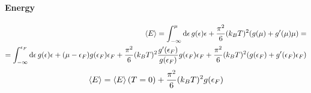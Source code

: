 \paragraph{Energy}
\begin{align*}
\expval{E} = \int_{-\infty}^\mu \dd{\epsilon} g(\epsilon) \epsilon + \frac{\pi^2}{6} (k_BT)^2 \qty(g(\mu) + g'(\mu) \mu ) =\\= \int_{-\infty}^{\epsilon_F} \dd{\epsilon} g(\epsilon) \epsilon + (\mu-\epsilon_F) g(\epsilon_F) \epsilon_F + \frac{\pi^2}{6} (k_BT)^2 \frac{g'(\epsilon_F)}{g(\epsilon_F)} g(\epsilon_F)\epsilon_F + \frac{\pi^2}{6} (k_BT)^2 \qty(g(\epsilon_F) + g'(\epsilon_F)\epsilon_F)
\end{align*}
$$ \expval{E} = \expval{E}(T=0) + \frac{\pi^2}{6} (k_BT)^2 g(\epsilon_F)  $$